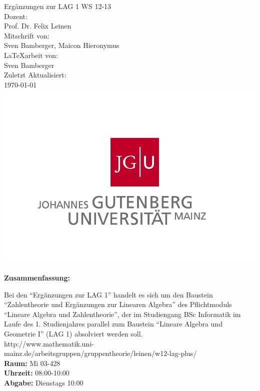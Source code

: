 \begin{titlepage}
\center
\Large Ergänzungen zur LAG 1 WS 12-13\large \\[2em]
Dozent:\\Prof. Dr. Felix Leinen\\[2em]
Mitschrift von:\\Sven Bamberger, Maicon Hieronymus\\[2em]
\LaTeX{arbeit} von:\\Sven Bamberger\\[2em]
Zuletzt Aktualisiert:\\\today\\
\includegraphics[scale=.2]{front/pics/Logo.jpg}\\\quad\\
\Large \textbf{Zusammenfassung:}\\[1em]
\parbox{0.75\textwidth}{\large
Bei den "`Ergänzungen zur LAG 1"' handelt es sich um den Baustein "`Zahlentheorie und Ergänzungen zur Linearen Algebra"' des Pflichtmoduls "`Lineare Algebra und Zahlentheorie"', der im Studiengang BSc Informatik im Laufe des 1. Studienjahres parallel zum Baustein "`Lineare Algebra und Geometrie I"' (LAG 1) absolviert werden soll.\\
http://www.mathematik.uni-mainz.de/arbeitsgruppen/gruppentheorie/leinen/w12-lag-plus/\\
\textbf{Raum:} Mi 03-428\\
\textbf{Uhrzeit:} 08:00-10:00\\
\textbf{Abgabe:} Dienstags 10:00\\
}
\end{titlepage}